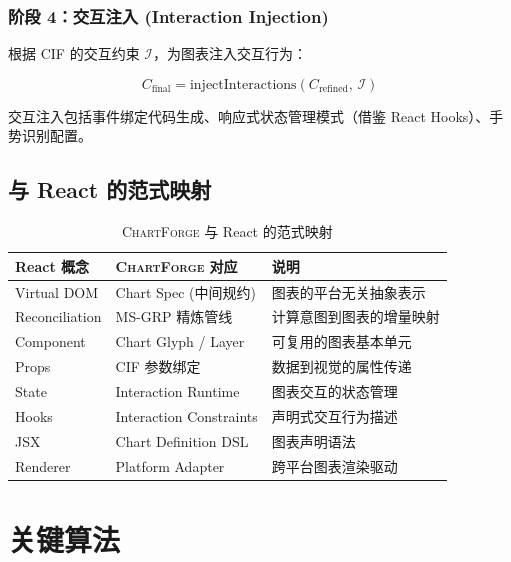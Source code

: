 \documentclass[12pt,a4paper]{ctexart}
\theoremstyle{remark}
\newcommand{\ChartForge}{\textsc{ChartForge}}
\begin{document}
\subsubsection{阶段 4：交互注入 (Interaction Injection)}

根据 CIF 的交互约束 $\mathcal{I}$，为图表注入交互行为：

\begin{equation}
    C_{\text{final}} = \text{injectInteractions}(C_{\text{refined}},\, \mathcal{I})
\end{equation}

交互注入包括事件绑定代码生成、响应式状态管理模式（借鉴 React Hooks）、手势识别配置。

\subsection{与 React 的范式映射}

\begin{table}[H]
\centering
\caption{\ChartForge{} 与 React 的范式映射}
\label{tab:react_map}
\begin{tabular}{l|l|l}
\toprule
\textbf{React 概念} & \textbf{\ChartForge{} 对应} & \textbf{说明} \\
\midrule
Virtual DOM     & Chart Spec (中间规约)    & 图表的平台无关抽象表示 \\
Reconciliation  & MS-GRP 精炼管线         & 计算意图到图表的增量映射 \\
Component       & Chart Glyph / Layer     & 可复用的图表基本单元 \\
Props           & CIF 参数绑定             & 数据到视觉的属性传递 \\
State           & Interaction Runtime     & 图表交互的状态管理 \\
Hooks           & Interaction Constraints & 声明式交互行为描述 \\
JSX             & Chart Definition DSL    & 图表声明语法 \\
Renderer        & Platform Adapter        & 跨平台图表渲染驱动 \\
\bottomrule
\end{tabular}
\end{table}

\section{关键算法}
\end{document}
